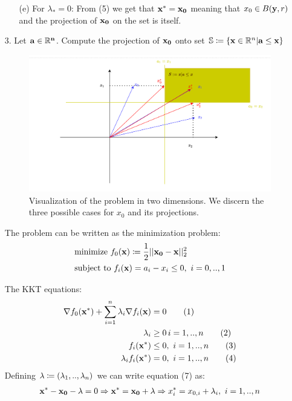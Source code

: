 \documentclass[12pt]{article}
\newcommand\numberthis{\addtocounter{equation}{1}\tag{\theequation}}
\begin{document}
\begin{enumerate}
\begin{enumerate}
			\item[(e)] 
			For $\lambda_*=0$: From (5) we get that ${\bf x^*}={\bf x_0}$ meaning that $x_0\in B({\bf y},r)$ and the projection of ${\bf x_0}$ on the set is itself.
		\end{enumerate}
		\newpage
		\item[3.]
		Let ${\bf a\in \mathbb{R}^n}$. Compute the projection of ${\bf x_0}$ onto set $\mathbb{S}\coloneqq\{{\bf x}\in \mathbb{R}^n | {\bf a\leq {\bf x}}\}$\\
		
		\begin{figure}[h!]
			\begin{center}
				\includegraphics[width=1\linewidth]{3}
			\end{center}
			\caption{Visualization of the problem in two dimensions. We discern the three possible cases for $x_0$ and its projections.}
		\end{figure}
		The problem can be written as the minimization problem:
		\begin{align*}
			&\text{minimize }f_0({\bf x})\coloneqq \frac{1}{2}||{\bf x_0}-{\bf x}||_2^2\\
			&\text{subject to }f_i({\bf x})=a_i-x_i\leq 0,\ i=0,..,1
		\end{align*}
		
		The KKT equations:
		\begin{align*}
			\nabla f_0({\bf x^*})+\sum_{i=1}^{n}\lambda_i\nabla f_i({\bf x})&=0\numberthis\\
			\lambda_i&\geq0\, i=1,..,n\numberthis\\
			f_i({\bf x^*})&\leq 0,\ i=1,..,n\numberthis\\
			\lambda_if_i({\bf x^*})&=0,\ i=1,..,n\numberthis
		\end{align*}
		Defining ${\bf \lambda}\coloneqq(\lambda_1,..,\lambda_n)$ we can write equation (7) as:
		\begin{align}
			{\bf x^*}-{\bf x_0}-{\bf \lambda}=0 \Rightarrow {\bf x^*}={\bf x_0}+{\bf \lambda} \Rightarrow x^*_i = x_{0,i}+\lambda_i,\ i=1,..,n
		\end{align}
	

\end{enumerate}
\end{document}
